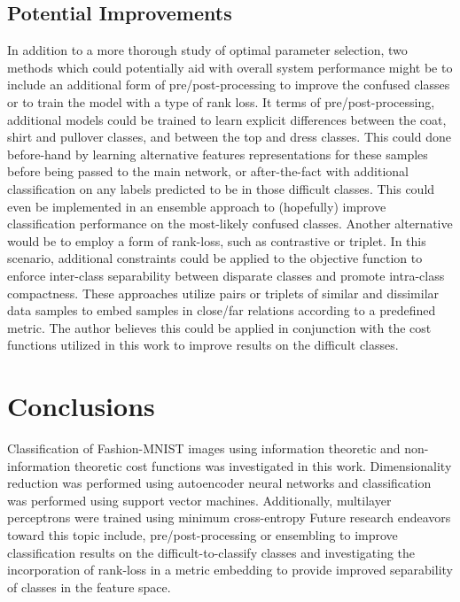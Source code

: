 \documentclass[conference]{IEEEtran}
\begin{document}
\subsection{Potential Improvements}
In addition to a more thorough study of optimal parameter selection, two methods which could potentially aid with overall system performance might be to include an additional form of pre/post-processing to improve the confused classes or to train the model with a type of rank loss.  It terms of pre/post-processing, additional models could be trained to learn explicit differences between the coat, shirt and  pullover classes, and between the top and dress classes.  This could done before-hand by learning alternative  features representations for these samples before being passed to the main network, or after-the-fact with additional classification on any labels predicted to be in those difficult classes.  This could even be implemented in an ensemble approach to (hopefully) improve classification performance on the most-likely confused classes.  Another alternative  would be to employ a form of rank-loss, such as contrastive or triplet.  In this scenario, additional constraints could be applied to the objective function to enforce inter-class separability between disparate classes and promote intra-class compactness.  These approaches utilize pairs or triplets of similar and  dissimilar data samples to embed samples  in close/far relations according to a predefined metric.  The author believes this could be applied  in conjunction with the cost functions utilized in this work to improve results on the difficult classes.




\section{Conclusions} \label{Conclusions}
Classification of Fashion-MNIST images using information theoretic and non-information theoretic cost functions was investigated in this work.  Dimensionality reduction was performed using autoencoder neural networks and classification was performed using support vector machines. Additionally, multilayer perceptrons were trained using minimum cross-entropy 
\indent
Future research endeavors toward this topic include, pre/post-processing or ensembling to improve classification results on the difficult-to-classify classes and investigating the incorporation of rank-loss in a metric embedding to provide improved separability of classes in the  feature space.
\end{document}
